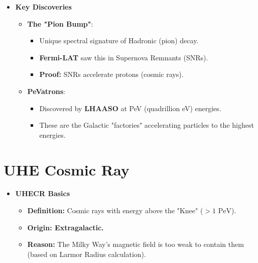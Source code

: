 \documentclass{sciposter}
\begin{document}
\begin{multicols}{3}
\begin{itemize}
  \item \textbf{Key Discoveries}
    \begin{itemize}
      \item \textbf{The "Pion Bump"}:
        \begin{itemize}
          \item Unique spectral signature of Hadronic (pion) decay.
          \item \textbf{Fermi-LAT} saw this in Supernova Remnants (SNRs).
          \item \textbf{Proof:} SNRs accelerate protons (cosmic rays).
        \end{itemize}
      \item \textbf{PeVatrons}:
        \begin{itemize}
          \item Discovered by \textbf{LHAASO} at PeV (quadrillion eV) energies.
          \item These are the Galactic "factories" accelerating particles to the highest energies.
        \end{itemize}
    \end{itemize}
\end{itemize}

\section{UHE Cosmic Ray}

\begin{itemize}
    \item \textbf{UHECR Basics}
    \begin{itemize}
        \item \textbf{Definition:} Cosmic rays with energy above the "Knee" ($> 1 \text{ PeV}$).
        \item \textbf{Origin: Extragalactic.}
        \item \textbf{Reason:} The Milky Way's magnetic field is too weak to contain them (based on Larmor Radius calculation).
    \end{itemize}


\end{itemize}
\end{multicols}
\end{document}
